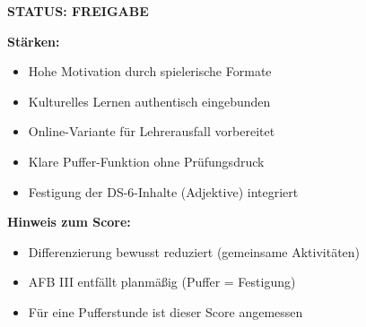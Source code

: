 \documentclass[11pt,a4paper]{article}
\begin{document}
\begin{scorebox}
\vspace{1em}
\textcolor{successgreen}{\textbf{STATUS: FREIGABE}}

\vspace{1em}
\textbf{Stärken:}
\begin{itemize}
    \item Hohe Motivation durch spielerische Formate
    \item Kulturelles Lernen authentisch eingebunden
    \item Online-Variante für Lehrerausfall vorbereitet
    \item Klare Puffer-Funktion ohne Prüfungsdruck
    \item Festigung der DS-6-Inhalte (Adjektive) integriert
\end{itemize}

\textbf{Hinweis zum Score:}
\begin{itemize}
    \item Differenzierung bewusst reduziert (gemeinsame Aktivitäten)
    \item AFB III entfällt planmäßig (Puffer = Festigung)
    \item Für eine Pufferstunde ist dieser Score angemessen
\end{itemize}

\end{scorebox}
\end{document}
